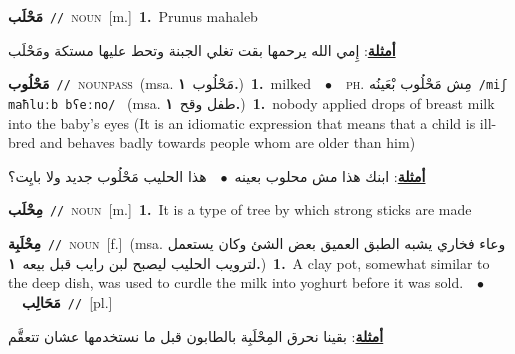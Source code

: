 \documentclass[10pt,a4paper,twoside]{article} %
\begin{document}
\begin{multicols}{2}
{\setlength\topsep{0pt}\textbf{\foreignlanguage{arabic}{مَحْلَب}}\ {\color{gray}\texttt{//}\color{black}}\ \textsc{noun}\ [m.]\ \textbf{1.}~Prunus mahaleb\  \begin{flushright}\color{gray}\foreignlanguage{arabic}{\textbf{\underline{\foreignlanguage{arabic}{أمثلة}}}: إِمي الله يرحمها بقت تغلي الجبنة وتحط عليها مستكة ومَحْلَب}\end{flushright}\color{black}} \vspace{2mm}

{\setlength\topsep{0pt}\textbf{\foreignlanguage{arabic}{مَحْلُوب}}\ {\color{gray}\texttt{//}\color{black}}\ \textsc{noun\textunderscore pass}\ \color{gray}(msa. \foreignlanguage{arabic}{مَحْلُوب}~\foreignlanguage{arabic}{\textbf{١.}})\color{black}\ \textbf{1.}~milked\ \ $\bullet$\ \ \textsc{ph.} \color{gray} \foreignlanguage{arabic}{مِش مَحْلُوب بْعَينُه}\color{black}\ {\color{gray}\texttt{/{\sffamily miʃ maħluːb bʕeːno}/}\color{black}}\ \color{gray} (msa. \foreignlanguage{arabic}{طفل وقح}~\foreignlanguage{arabic}{\textbf{١.}})\color{black}\ \textbf{1.}~nobody applied drops of breast milk into the baby's eyes (It is an idiomatic expression that means that a child is ill-bred and behaves badly towards people whom are older than him)\  \begin{flushright}\color{gray}\foreignlanguage{arabic}{\textbf{\underline{\foreignlanguage{arabic}{أمثلة}}}: ابنك هذا مش محلوب بعينه\ $\bullet$\ \  هذا الحليب مَحْلُوب جديد ولا بايِت؟}\end{flushright}\color{black}} \vspace{2mm}

{\setlength\topsep{0pt}\textbf{\foreignlanguage{arabic}{مِحْلَب}}\ {\color{gray}\texttt{//}\color{black}}\ \textsc{noun}\ [m.]\ \textbf{1.}~It is a type of tree by which strong sticks are made\ } \vspace{2mm}

{\setlength\topsep{0pt}\textbf{\foreignlanguage{arabic}{مِحْلَبِة}}\ {\color{gray}\texttt{//}\color{black}}\ \textsc{noun}\ [f.]\ \color{gray}(msa. \foreignlanguage{arabic}{وعاء فخاري يشبه الطبق العميق بعض الشئ وكان يستعمل لترويب الحليب ليصبح لبن رايب قبل بيعه}~\foreignlanguage{arabic}{\textbf{١.}})\color{black}\ \textbf{1.}~A clay pot, somewhat similar to the deep dish, was used to curdle the milk into yoghurt before it was sold.\ \ $\bullet$\ \ \setlength\topsep{0pt}\textbf{\foreignlanguage{arabic}{مَحَالِب}}\ {\color{gray}\texttt{//}\color{black}}\ [pl.]\  \begin{flushright}\color{gray}\foreignlanguage{arabic}{\textbf{\underline{\foreignlanguage{arabic}{أمثلة}}}: بقينا نحرق المِحْلَبِة بالطابون قبل ما نستخدمها عشان تتعقَّم}\end{flushright}\color{black}} \vspace{2mm}


\end{multicols}
\end{document}
